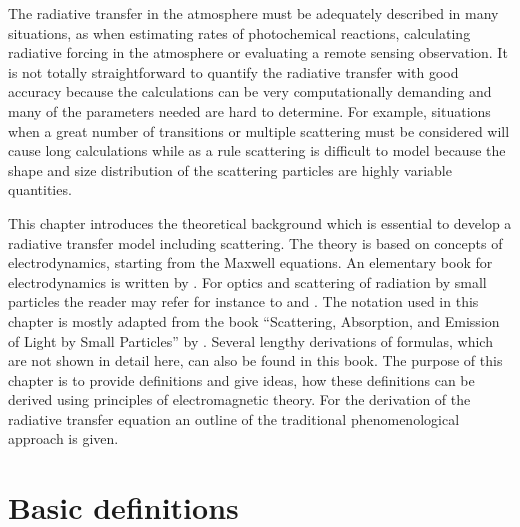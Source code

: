  The radiative transfer in the atmosphere must be adequately described
 in many situations, as when estimating rates of photochemical
 reactions, calculating radiative forcing in the atmosphere or
 evaluating a remote sensing observation. It is not totally
 straightforward to quantify the radiative transfer with good accuracy
 because the calculations can be very computationally demanding and
 many of the parameters needed are hard to determine. For example,
 situations when a great number of transitions or multiple scattering
 must be considered will cause long calculations while as a rule
 scattering is difficult to model because the shape and size
 distribution of the scattering particles are highly variable
 quantities.  

 This chapter introduces the theoretical background which is essential
 to develop a radiative transfer model including scattering. The theory
 is based on concepts of electrodynamics, starting from the Maxwell
 equations.  An elementary book for electrodynamics is written by
 \citet{jackson98:_class}.  For optics and scattering of radiation by
 small particles the reader may refer for instance to
 \citet{hulst57:_light_scatt_small} and \citet{bohren:98}. The notation
 used in this chapter is mostly adapted from the book ``Scattering,
 Absorption, and Emission of Light by Small Particles'' by
 \citet{Mishchenko:02}. Several lengthy derivations of formulas, which
 are not shown in detail here, can also be found in this book. The
 purpose of this chapter is to provide definitions and give ideas, how
 these definitions can be derived using principles of electromagnetic
 theory. For the derivation of the radiative transfer equation an
 outline of the traditional phenomenological approach is given.
 
 \section{Basic definitions}
 \label{sec:rtetheory:theory_basics}
 
